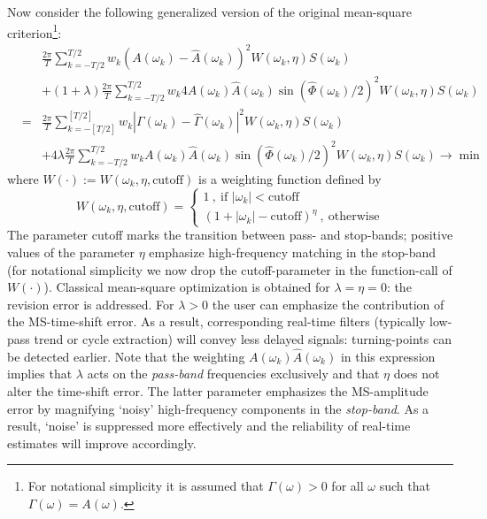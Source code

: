 \documentclass[11pt]{article}
\begin{document}
Now consider the following generalized version of the original mean-square criterion\footnote{For notational simplicity it is assumed that $\Gamma(\omega)>0$ for all $\omega$ such that $\Gamma(\omega)=A(\omega)$.}:
\begin{eqnarray} &&\frac{2\pi}{ T} \sum_{k=-T/2}^{T/2}w_k
(A(\omega_k)-\hat{A}(\omega_k))^2W(\omega_k,\eta) S(\omega_k)\nonumber\\
&&+(1+\lambda)\frac{2\pi}{ T} \sum_{k=-T/2}^{T/2}w_k
4A(\omega_k)\hat{A}(\omega_k)\sin(\hat{\Phi}(\omega_k)/2)^2
W(\omega_k,\eta)S(\omega_k)\nonumber\\
&=&\frac{2\pi}{T} \sum_{k=-[T/2]}^{[T/2]}
w_k|\Gamma(\omega_k)-\hat{\Gamma}(\omega_k)|^2 W(\omega_k,\eta)S(\omega_k)\nonumber\\
&&+4\lambda\frac{2\pi}{ T} \sum_{k=-T/2}^{T/2}w_k
A(\omega_k)\hat{A}(\omega_k)\sin(\hat{\Phi}(\omega_k)/2)^2
W(\omega_k,\eta)S(\omega_k)\to\min\label{dfatp}
\end{eqnarray}
where $W(\cdot):=W(\omega_k,\eta,\textrm{cutoff})$ is a  weighting function defined by
\begin{equation}\label{w}
W(\omega_k,\eta,\textrm{cutoff})=\left\{\begin{array}{cc}
1~,~\textrm{if~} |\omega_k|<\textrm{cutoff}\\
(1+|\omega_k|-\textrm{cutoff})^{\eta}~,~\textrm{otherwise}
\end{array}\right.
\end{equation}
The parameter cutoff marks the transition between pass- and stop-bands; positive values of the parameter $\eta$ emphasize high-frequency matching in the stop-band (for notational simplicity we now drop the cutoff-parameter in the function-call of $W(\cdot)$). Classical mean-square optimization is obtained for $\lambda=\eta=0$: the revision error is addressed. For $\lambda>0$ the user can emphasize the contribution of the MS-time-shift error. As a result, corresponding real-time filters (typically low-pass trend or cycle extraction) will convey less delayed signals: turning-points can be detected earlier. Note that the weighting $A(\omega_k)\hat{A}(\omega_k)$ in this expression implies that $\lambda$ acts on the \emph{pass-band} frequencies exclusively and that $\eta$ does not alter the time-shift error. The latter parameter emphasizes the MS-amplitude error by magnifying `noisy' high-frequency components in the \emph{stop-band}. As a result, `noise' is suppressed more effectively and the reliability of real-time estimates will improve accordingly. \\
\end{document}
